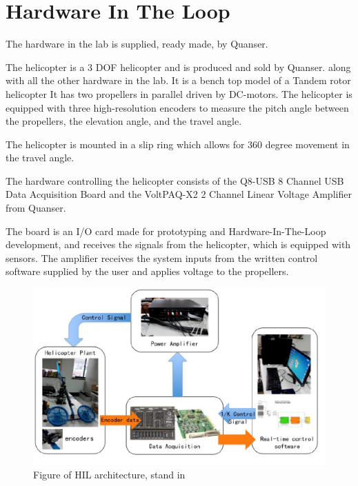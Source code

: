 \section{Hardware In The Loop}

The hardware in the lab is supplied, ready made, by Quanser. 


The helicopter is a 3 DOF helicopter and is produced and sold by Quanser. along with all the other hardware in the lab. It is a bench top model of a Tandem rotor helicopter %
It has two propellers in parallel driven by DC-motors. The helicopter is equipped with three high-resolution encoders to measure the pitch angle between the propellers, the elevation angle, and the travel angle. 

\cite{user_manual_q8_board}
The helicopter is mounted in a slip ring which allows for 360 degree movement in the travel angle.

The hardware controlling the helicopter consists of the Q8-USB 8 Channel USB Data Acquisition Board and the VoltPAQ-X2 2 Channel Linear Voltage Amplifier from Quanser.

The board is an I/O card made for prototyping and Hardware-In-The-Loop development, and receives the signals from the helicopter, which is equipped with sensors. The amplifier receives the system inputs from the written control software supplied by the user and applies voltage to the propellers.


\begin{figure}
    \centering
    \includegraphics[scale=0.3]{fig/HIL_figure.png}
    \caption{Figure of HIL architecture, stand in}
    \label{fig:hil_architecture}
\end{figure}

